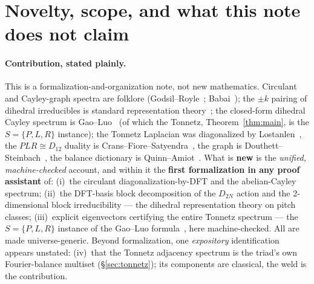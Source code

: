 \documentclass[11pt]{article}
\begin{document}
\section{Novelty, scope, and what this note does not claim}\label{sec:novelty}

\paragraph{Contribution, stated plainly.} This is a formalization-and-organization note, not new
mathematics. Circulant and Cayley-graph spectra are folklore (Godsil--Royle~\cite{GR};
Babai~\cite{Babai}); the $\pm k$ pairing of dihedral irreducibles is standard representation
theory~\cite{Diaconis}; the closed-form dihedral Cayley spectrum is Gao--Luo~\cite{GaoLuo} (of which the
Tonnetz, Theorem~\ref{thm:main}, is the $S=\{P,L,R\}$ instance); the Tonnetz Laplacian was diagonalized by
Lostanlen~\cite{Lostanlen}, the $PLR\cong D_{12}$ duality is Crans--Fiore--Satyendra~\cite{CFS}, the graph is
Douthett--Steinbach~\cite{DS}, the balance dictionary is Quinn--Amiot~\cite{Quinn,Amiot}. What is
\textbf{new} is the \emph{unified, machine-checked} account, and within it the \textbf{first formalization in
any proof assistant} of: (i)~the circulant diagonalization-by-DFT and the abelian-Cayley spectrum;
(ii)~the DFT-basis block decomposition of the $D_{2N}$ action and the $2$-dimensional block irreducibility
--- the dihedral representation theory on pitch classes; (iii)~explicit eigenvectors certifying the entire
Tonnetz spectrum --- the $S=\{P,L,R\}$ instance of the Gao--Luo formula~\cite{GaoLuo}, here machine-checked.
All are made universe-generic. Beyond formalization, one \emph{expository} identification appears
unstated: (iv)~that the Tonnetz adjacency spectrum is the triad's own Fourier-balance multiset
(\S\ref{sec:tonnetz}); its components are classical, the weld is the contribution.
\end{document}
